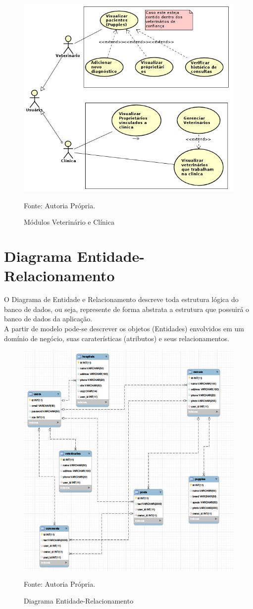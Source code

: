 \begin{figure}[h!]
	\centering	\includegraphics[scale=0.55
	]{imagens/HeVcasosdeuso}
	\caption{Módulos Veterinário e Clínica}
	Fonte: Autoria Própria.
	\label{Rotulo}
\end{figure}

\newpage

\section{Diagrama Entidade-Relacionamento}
O Diagrama de Entidade e Relacionamento descreve toda estrutura lógica do banco de dados,  ou seja, represente de forma abstrata a estrutura que possuirá o banco de dados da aplicação.
\\
\indent
A partir de modelo pode-se descrever os objetos (Entidades) envolvidos em um domínio de negócio, suas caraterísticas (atributos) e seus relacionamentos.

\begin{figure}[h!]
	\centering	\includegraphics[scale=0.80
	]{imagens/entidaderelacionamento}
	\caption{Diagrama Entidade-Relacionamento}
	Fonte: Autoria Própria.
	\label{Rotulo}
\end{figure}
